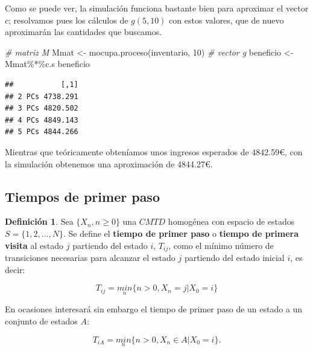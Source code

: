 \documentclass[
]{book}
\newenvironment{Shaded}{\begin{snugshade}}{\end{snugshade}}
\newcommand{\CommentTok}[1]{\textcolor[rgb]{0.56,0.35,0.01}{\textit{#1}}}
\newcommand{\DecValTok}[1]{\textcolor[rgb]{0.00,0.00,0.81}{#1}}
\newcommand{\FunctionTok}[1]{\textcolor[rgb]{0.00,0.00,0.00}{#1}}
\newcommand{\NormalTok}[1]{#1}
\newcommand{\OtherTok}[1]{\textcolor[rgb]{0.56,0.35,0.01}{#1}}
\newcommand{\SpecialCharTok}[1]{\textcolor[rgb]{0.00,0.00,0.00}{#1}}
\newenvironment{yellowbox}{
  \definecolor{shadecolor}{rgb}{210, 180, 140}  
  \color{black}
  \begin{shaded}}
 {\end{shaded}}
\theoremstyle{definition}
\newtheorem{definition}{Definición}[chapter]
\theoremstyle{definition}
\theoremstyle{definition}
\theoremstyle{definition}
\theoremstyle{remark}
\begin{document}
Como se puede ver, la simulación funciona bastante bien para aproximar el vector \(c\); resolvamos pues los cálculos de \(g(5,10)\) con estos valores, que de nuevo aproximarán las cantidades que buscamos.

\begin{Shaded}
\begin{Highlighting}[]
\CommentTok{\# matriz M}
\NormalTok{Mmat }\OtherTok{\textless{}{-}} \FunctionTok{mocupa.proceso}\NormalTok{(inventario, }\DecValTok{10}\NormalTok{)}
\CommentTok{\# vector g}
\NormalTok{beneficio }\OtherTok{\textless{}{-}}\NormalTok{ Mmat}\SpecialCharTok{\%*\%}\NormalTok{c.s}
\NormalTok{beneficio}
\end{Highlighting}
\end{Shaded}

\begin{verbatim}
##           [,1]
## 2 PCs 4738.291
## 3 PCs 4820.502
## 4 PCs 4849.143
## 5 PCs 4844.266
\end{verbatim}

Mientras que teóricamente obteníamos unos ingresos esperados de 4842.59€, con la simulación obtenemos una aproximación de 4844.27€.

\hypertarget{tiempos-de-primer-paso}{%
\subsection{Tiempos de primer paso}\label{tiempos-de-primer-paso}}

\begin{yellowbox}

\begin{definition}
Sea \(\{X_n, n \geq 0\}\) una \(CMTD\) homogénea con espacio de estados \(S = \{1, 2,...,N\}\). Se define el \textbf{tiempo de primer paso} o \textbf{tiempo de primera visita} al estado \(j\) partiendo del estado \(i\), \(T_{ij}\), como el mínimo número de transiciones necesarias para alcanzar el estado \(j\) partiendo del estado inicial \(i\), es decir:

\[T_{ij} = \underset{n}{min}\{n > 0, X_n = j | X_0 = i\}\]

En ocasiones interesará sin embargo el tiempo de primer paso de un estado a un conjunto de estados \(A\):

\[T_{iA} = \underset{n}{min}\{n > 0, X_n \in A | X_0 = i\}.\]
\end{definition}

\end{yellowbox}
\end{document}
